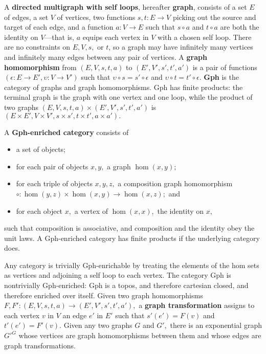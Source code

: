 \documentclass[a4paper,UKenglish]{article}
\newcommand{\maps}{\colon}
\begin{document}
A {\bf directed multigraph with self loops}, hereafter {\bf graph}, consists of a set $E$ of edges, a set $V$ of vertices, two functions $s,t\maps E \to V$ picking out the source and target of each edge, and a function $a\maps V \to E$ such that $s\circ a$ and $t \circ a$ are both the identity on $V$---that is, $a$ equips each vertex in $V$ with a chosen self loop.  There are no constraints on $E, V, s,$ or $t$, so a graph may have infinitely many vertices and infinitely many edges between any pair of vertices.  A {\bf graph homomorphism} from $(E, V, s, t, a)$ to $(E', V', s', t', a')$ is a pair of functions $(\epsilon\maps E \to E', \upsilon\maps V \to V')$ such that $\upsilon\circ s = s' \circ \epsilon$ and $\upsilon\circ t = t' \circ \epsilon$.  {\bf Gph} is the category of graphs and graph homomorphisms.  Gph has finite products: the terminal graph is the graph with one vertex and one loop, while the product of two graphs $(E, V, s, t, a) \times (E', V', s', t', a')$ is $(E \times E', V \times V', s \times s', t\times t', a \times a').$

A {\bf Gph-enriched category} consists of
\begin{itemize}
  \item a set of objects;
  \item for each pair of objects $x, y,$ a graph $\hom(x,y);$
  \item for each triple of objects $x, y, z,$ a composition graph homomorphism $\circ\maps \hom(y, z) \times \hom(x, y) \to \hom(x, z);$ and
  \item for each object $x,$ a vertex of $\hom(x, x),$ the identity on $x,$
\end{itemize}
such that composition is associative, and composition and the identity obey the unit laws.  A Gph-enriched category has finite products if the underlying category does.

Any category is trivially Gph-enrichable by treating the elements of the hom sets as vertices and adjoining a self loop to each vertex.  The category Gph is nontrivially Gph-enriched: Gph is a topos, and therefore cartesian closed, and therefore enriched over itself.  Given two graph homomorphisms $F, F'\maps (E, V, s, t, a) \to (E', V', s', t', a'),$ a {\bf graph transformation} assigns to each vertex $v$ in $V$ an edge $e'$ in $E'$ such that $s'(e') = F(v)$ and $t'(e') = F'(v).$  Given any two graphs $G$ and $G',$ there is an exponential graph $G'^G$ whose vertices are graph homomorphisms between them and whose edges are graph transformations.
\end{document}
